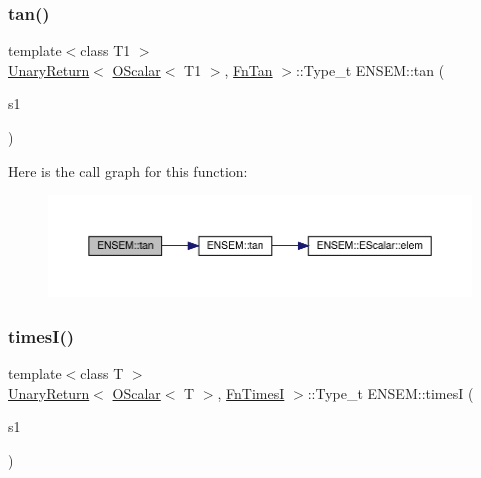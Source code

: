 \subsubsection{\texorpdfstring{tan()}{tan()}}
{\footnotesize\ttfamily template$<$class T1 $>$ \\
\mbox{\hyperlink{structENSEM_1_1UnaryReturn}{Unary\+Return}}$<$ \mbox{\hyperlink{classENSEM_1_1OScalar}{O\+Scalar}}$<$ T1 $>$, \mbox{\hyperlink{structENSEM_1_1FnTan}{Fn\+Tan}} $>$\+::Type\+\_\+t E\+N\+S\+E\+M\+::tan (\begin{DoxyParamCaption}\item[{const \mbox{\hyperlink{classENSEM_1_1OScalar}{O\+Scalar}}$<$ T1 $>$ \&}]{s1 }\end{DoxyParamCaption})\hspace{0.3cm}{\ttfamily [inline]}}

Here is the call graph for this function\+:\nopagebreak
\begin{figure}[H]
\begin{center}
\leavevmode
\includegraphics[width=350pt]{d1/d71/group__obsscalar_ga9d270814e58292523d977713c693c876_cgraph}
\end{center}
\end{figure}
\mbox{\label{group__obsscalar_gad7403718b5f9341f1aafa59ca287ea31}} 
\subsubsection{\texorpdfstring{timesI()}{timesI()}}
{\footnotesize\ttfamily template$<$class T $>$ \\
\mbox{\hyperlink{structENSEM_1_1UnaryReturn}{Unary\+Return}}$<$ \mbox{\hyperlink{classENSEM_1_1OScalar}{O\+Scalar}}$<$ T $>$, \mbox{\hyperlink{structENSEM_1_1FnTimesI}{Fn\+TimesI}} $>$\+::Type\+\_\+t E\+N\+S\+E\+M\+::timesI (\begin{DoxyParamCaption}\item[{const \mbox{\hyperlink{classENSEM_1_1OScalar}{O\+Scalar}}$<$ T $>$ \&}]{s1 }\end{DoxyParamCaption})\hspace{0.3cm}{\ttfamily [inline]}}

